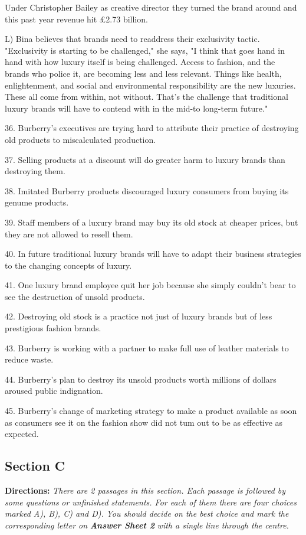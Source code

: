 \documentclass[UTF8,11pt]{ctexart}
\begin{document}
Under Christopher Bailey as creative director they turned the brand around and this past year revenue hit £2.73 billion.


L) Bina believes that brands need to readdress their exclusivity tactic. "Exclusivity is starting to be challenged," she says, "I think that goes hand in hand with how luxury itself is being challenged. Access to fashion, and the brands who police it, are becoming less and less relevant. Things like health, enlightenment, and social and environmental responsibility are the new luxuries. These all come from within, not without. That's the challenge that traditional luxury brands will have to contend with in the mid-to long-term future."


36. Burberry's executives are trying hard to attribute their practice of destroying old products to miscalculated production.


37. Selling products at a discount will do greater harm to luxury brands than destroying them.


38. Imitated Burberry products discouraged luxury consumers from buying its genume products.


39. Staff members of a luxury brand may buy its old stock at cheaper prices, but they are not allowed to resell them.


40. In future traditional luxury brands will have to adapt their business strategies to the changing concepts of luxury.


41. One luxury brand employee quit her job because she simply couldn't bear to see the destruction of unsold products.


42. Destroying old stock is a practice not just of luxury brands but of less prestigious fashion brands.


43. Burberry is working with a partner to make full use of leather materials to reduce waste.


44. Burberry's plan to destroy its unsold products worth millions of dollars aroused public indignation.


45. Burberry's change of marketing strategy to make a product available as soon as consumers see it on the fashion show did not tum out to be as effective as expected.


\subsection*{\textbf{Section C}}


\textbf{Directions: }\textit{There are 2 passages in this section. Each passage is followed by some questions} \textit{or unfinished statements. For each of them there are four choices marked A), B), C) and D).} \textit{You should decide on the best choice and mark the corresponding letter on }\textbf{\textit{Answer Sheet 2}} \textit{with a single line through the centre.}
\end{document}
